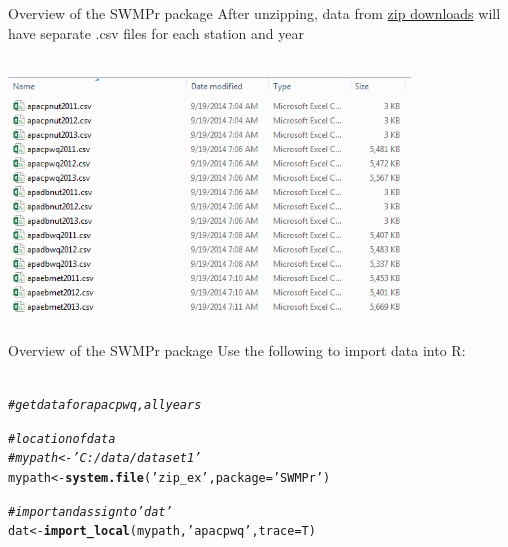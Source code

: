 \documentclass[xcolor=svgnames]{beamer}\usepackage[]{graphicx}\usepackage[]{color}
\makeatletter
\newcommand{\hlstr}[1]{\textcolor[rgb]{0.192,0.494,0.8}{#1}}%
\newcommand{\hlcom}[1]{\textcolor[rgb]{0.678,0.584,0.686}{\textit{#1}}}%
\newcommand{\hlstd}[1]{\textcolor[rgb]{0.345,0.345,0.345}{#1}}%
\newcommand{\hlkwb}[1]{\textcolor[rgb]{0.69,0.353,0.396}{#1}}%
\newcommand{\hlkwc}[1]{\textcolor[rgb]{0.333,0.667,0.333}{#1}}%
\newcommand{\hlkwd}[1]{\textcolor[rgb]{0.737,0.353,0.396}{\textbf{#1}}}%
\newenvironment{kframe}{%
 \def\at@end@of@kframe{}%
 \ifinner\ifhmode%
  \def\at@end@of@kframe{\end{minipage}}%
  \begin{minipage}{\columnwidth}%
 \fi\fi%
 \def\FrameCommand##1{\hskip\@totalleftmargin \hskip-\fboxsep
 \colorbox{shadecolor}{##1}\hskip-\fboxsep
     \hskip-\linewidth \hskip-\@totalleftmargin \hskip\columnwidth}%
 \MakeFramed {\advance\hsize-\width
   \@totalleftmargin\z@ \linewidth\hsize
   \@setminipage}}%
 {\par\unskip\endMakeFramed%
 \at@end@of@kframe}
\newenvironment{knitrout}{}{} %
\makeatother
\begin{document}
\begin{frame}{Overview of the SWMPr package}
After unzipping, data from \href{http://cdmo.baruch.sc.edu/aqs/zips.cfm}{zip downloads} will have separate .csv files for each station and year\\~\\
\centerline{\includegraphics[width = 0.8\textwidth]{zips_ex.png}}
\end{frame}

\begin{frame}[fragile]{Overview of the SWMPr package}
Use the following to import data into R:\\~\\
\begin{knitrout}
\color{fgcolor}\begin{kframe}
\begin{alltt}
\hlcom{# get data for apacpwq, all years}

\hlcom{# location of data}
\hlcom{# mypath <- 'C:/data/dataset1'}
\hlstd{mypath} \hlkwb{<-} \hlkwd{system.file}\hlstd{(}\hlstr{'zip_ex'}\hlstd{,} \hlkwc{package} \hlstd{=} \hlstr{'SWMPr'}\hlstd{)}

\hlcom{# import and assign to 'dat'}
\hlstd{dat} \hlkwb{<-} \hlkwd{import_local}\hlstd{(mypath,} \hlstr{'apacpwq'}\hlstd{,} \hlkwc{trace} \hlstd{= T)}
\end{alltt}
\end{kframe}
\end{knitrout}
\end{frame}
\end{document}
